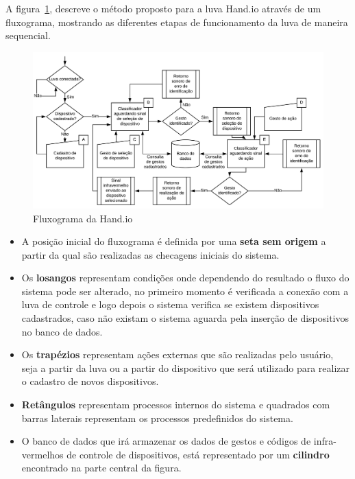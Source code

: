 A figura~\ref{fig:fluxograma}, descreve o método proposto para a luva Hand.io através de um fluxograma, mostrando as diferentes etapas de funcionamento da luva de maneira sequencial.

\begin{figure}[ht]
    \centering
	\includegraphics[width=\textwidth, keepaspectratio]{resources/fluxograma.pdf}
	\caption{Fluxograma da Hand.io}
	\label{fig:fluxograma}
\end{figure}

\begin{itemize}
    \item A posição inicial do fluxograma é definida por uma \textbf{seta sem origem} a partir da qual são realizadas as checagens iniciais do sistema.
    \item Os \textbf{losangos} representam condições onde dependendo do resultado o fluxo do sistema pode ser alterado, no primeiro momento é verificada a conexão com a luva de controle e logo depois o sistema verifica se existem dispositivos cadastrados, caso não existam o sistema aguarda pela inserção de dispositivos no banco de dados.
    \item Os \textbf{trapézios} representam ações externas que são realizadas pelo usuário, seja a partir da luva ou a partir do dispositivo que será utilizado para realizar o cadastro de novos dispositivos. 
    \item \textbf{Retângulos} representam processos internos do sistema 
e quadrados com barras laterais representam os processos predefinidos do sistema.
    \item O banco de dados que irá armazenar os dados de gestos e códigos de infra-vermelhos de controle de dispositivos, está representado por um \textbf{cilindro} encontrado na parte central da figura.
\end{itemize}




